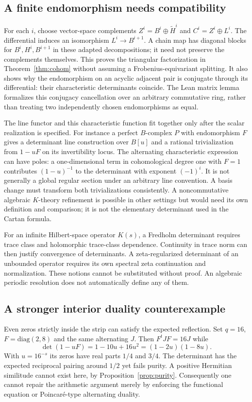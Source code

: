 \subsection{A finite endomorphism needs compatibility}
For each $i$, choose vector-space complements $Z^i=B^i\oplus\widetilde H^i$ and $C^i=Z^i\oplus L^i$. The differential induces an isomorphism $L^i\to B^{i+1}$. A chain map has diagonal blocks for $B^i,H^i,B^{i+1}$ in these adapted decompositions; it need not preserve the complements themselves. This proves the triangular factorization in Theorem~\ref{thm:cohom} without assuming a Frobenius-equivariant splitting. It also shows why the endomorphism on an acyclic adjacent pair is conjugate through its differential: their characteristic determinants coincide. The Lean matrix lemma formalizes this conjugacy cancellation over an arbitrary commutative ring, rather than treating two independently chosen endomorphisms as equal.

The line functor and this characteristic function fit together only after the scalar realization is specified. For instance a perfect $B$-complex $P$ with endomorphism $F$ gives a determinant line construction over $B[u]$ and a rational trivialization from $1-uF$ on its invertibility locus. The alternating characteristic expression can have poles: a one-dimensional term in cohomological degree one with $F=1$ contributes $(1-u)^{-1}$ to the determinant with exponent $(-1)^i$. It is not generally a global regular section under an arbitrary line convention. A basis change must transform both trivializations consistently. A noncommutative algebraic $K$-theory refinement is possible in other settings but would need its own definition and comparison; it is not the elementary determinant used in the Cartan formula.

For an infinite Hilbert-space operator $K(s)$, a Fredholm determinant requires trace class and holomorphic trace-class dependence. Continuity in trace norm can then justify convergence of determinants. A zeta-regularized determinant of an unbounded operator requires its own spectral zeta continuation and normalization. These notions cannot be substituted without proof. An algebraic periodic resolution does not automatically define any of them.

\subsection{A stronger interior duality counterexample}
Even zeros strictly inside the strip can satisfy the expected reflection. Set $q=16$, $F=\mathrm{diag}(2,8)$ and the same alternating $J$. Then $F^tJF=16J$ while
\[
 \det(1-uF)=1-10u+16u^2=(1-2u)(1-8u).
\]
With $u=16^{-s}$ its zeros have real parts $1/4$ and $3/4$. The determinant has the expected reciprocal pairing around $1/2$ yet fails purity. A positive Hermitian similitude cannot exist here, by Proposition~\ref{prop:purity}. Consequently one cannot repair the arithmetic argument merely by enforcing the functional equation or Poincar\'e-type alternating duality.

